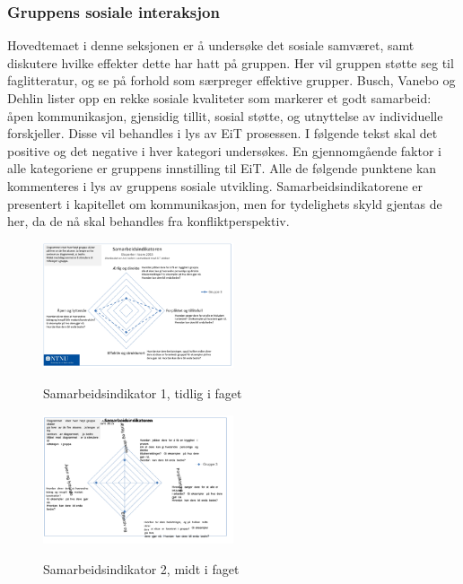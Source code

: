 \subsubsection{Gruppens sosiale interaksjon}

Hovedtemaet i denne seksjonen er å undersøke det sosiale samværet, samt diskutere hvilke effekter dette har hatt på gruppen.
Her vil gruppen støtte seg til faglitteratur\cite{orgorg}, og se på forhold som særpreger effektive grupper. 
Busch, Vanebo og Dehlin\cite[p.~257]{orgorg} lister opp en rekke sosiale kvaliteter som markerer et godt samarbeid: åpen kommunikasjon, gjensidig tillit, sosial støtte, og utnyttelse av individuelle forskjeller.
Disse vil behandles i lys av EiT prosessen.
I følgende tekst skal det positive og det negative i hver kategori undersøkes.
En gjennomgående faktor i alle kategoriene er gruppens innstilling til EiT. 
Alle de følgende punktene kan kommenteres i lys av gruppens sosiale utvikling. 
Samarbeidsindikatorene er presentert i kapitellet om kommunikasjon, men for tydelighets skyld gjentas de her, da de nå skal behandles fra konfliktperspektiv. 

\begin{figure}[h!]
  \caption{Samarbeidsindikator 1, tidlig i faget}
  \centering
    \includegraphics[width=0.5\textwidth]{Bilder/samarbeidsindikator1.png}\label{samarbeidsindikator1}

\end{figure}
\begin{figure}[h!]
  \caption{Samarbeidsindikator 2, midt i faget}
  \centering
    \includegraphics[width=0.5\textwidth]{Bilder/samarbeidsindikator_2.png}\label{samarbeidsindikator2}
\end{figure}

